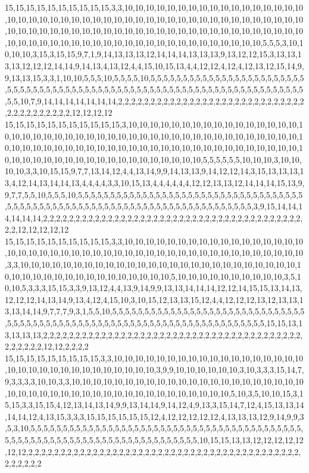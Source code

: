 15,15,15,15,15,15,15,15,15,15,3,3,10,10,10,10,10,10,10,10,10,10,10,10,10,10,10,10,10,10,10,10,10,10,10,10,10,10,10,10,10,10,10,10,10,10,10,10,10,10,10,10,10,10,10,10,10,10,10,10,10,10,10,10,10,10,10,10,10,10,10,10,10,10,10,10,10,10,10,10,10,10,10,10,10,10,10,10,10,10,10,10,10,10,10,10,10,10,10,10,10,10,10,10,10,10,10,10,10,5,5,5,3,10,10,10,10,3,15,3,15,15,9,7,1,9,14,13,13,13,12,14,14,14,13,13,13,9,13,12,12,15,3,13,13,13,13,12,12,12,14,14,9,14,13,4,13,12,4,4,15,10,15,13,4,4,12,12,4,12,4,12,13,12,15,14,9,9,13,13,15,3,3,1,10,10,5,5,5,10,5,5,5,5,10,5,5,5,5,5,5,5,5,5,5,5,5,5,5,5,5,5,5,5,5,5,5,5,5,5,5,5,5,5,5,5,5,5,5,5,5,5,5,5,5,5,5,5,5,5,5,5,5,5,5,5,5,5,5,5,5,5,5,5,5,5,5,5,5,5,5,5,5,5,5,5,5,10,7,9,14,14,14,14,14,14,14,2,2,2,2,2,2,2,2,2,2,2,2,2,2,2,2,2,2,2,2,2,2,2,2,2,2,2,2,2,2,2,2,2,2,2,2,2,2,2,12,12,12,12
15,15,15,15,15,15,15,15,15,15,15,3,10,10,10,10,10,10,10,10,10,10,10,10,10,10,10,10,10,10,10,10,10,10,10,10,10,10,10,10,10,10,10,10,10,10,10,10,10,10,10,10,10,10,10,10,10,10,10,10,10,10,10,10,10,10,10,10,10,10,10,10,10,10,10,10,10,10,10,10,10,10,10,10,10,10,10,10,10,10,10,10,10,10,10,10,10,10,10,10,10,10,10,5,5,5,5,5,5,10,10,10,3,10,10,10,10,3,3,10,15,15,9,7,7,13,14,12,4,4,13,14,9,9,14,13,13,9,14,12,12,14,3,15,13,13,13,13,4,12,14,13,14,14,13,4,4,4,4,3,3,10,15,13,4,4,4,4,4,4,12,12,13,13,12,14,14,14,15,13,9,9,7,7,5,5,10,5,5,5,10,5,5,5,5,5,5,5,5,5,5,5,5,5,5,5,5,5,5,5,5,5,5,5,5,5,5,5,5,5,5,5,5,5,5,5,5,5,5,5,5,5,5,5,5,5,5,5,5,5,5,5,5,5,5,5,5,5,5,5,5,5,5,5,5,5,5,5,5,5,5,5,5,5,3,9,15,14,14,14,14,14,14,2,2,2,2,2,2,2,2,2,2,2,2,2,2,2,2,2,2,2,2,2,2,2,2,2,2,2,2,2,2,2,2,2,2,2,2,2,2,2,2,2,2,12,12,12,12,12
15,15,15,15,15,15,15,15,15,15,3,3,10,10,10,10,10,10,10,10,10,10,10,10,10,10,10,10,10,10,10,10,10,10,10,10,10,10,10,10,10,10,10,10,10,10,10,10,10,10,10,10,10,10,10,10,10,3,3,10,10,10,10,10,10,10,10,10,10,10,10,10,10,10,10,10,10,10,10,10,10,10,10,10,10,10,10,10,10,10,10,10,10,10,10,10,10,10,10,10,10,5,10,10,10,10,10,10,10,10,10,10,3,5,10,10,5,3,3,3,15,15,3,3,9,13,12,4,4,13,9,14,9,9,13,13,14,14,14,12,12,14,15,15,13,14,13,12,12,12,14,13,14,9,13,4,12,4,15,10,3,10,15,12,13,13,15,12,4,4,12,12,12,13,12,13,13,13,13,14,14,9,7,7,7,9,3,1,5,5,10,5,5,5,5,5,5,5,5,5,5,5,5,5,5,5,5,5,5,5,5,5,5,5,5,5,5,5,5,5,5,5,5,5,5,5,5,5,5,5,5,5,5,5,5,5,5,5,5,5,5,5,5,5,5,5,5,5,5,5,5,5,5,5,5,5,5,5,5,5,5,15,15,13,13,13,13,13,2,2,2,2,2,2,2,2,2,2,2,2,2,2,2,2,2,2,2,2,2,2,2,2,2,2,2,2,2,2,2,2,2,2,2,2,2,2,2,2,2,2,2,2,2,2,12,12,2,2,2,2
15,15,15,15,15,15,15,15,15,3,3,10,10,10,10,10,10,10,10,10,10,10,10,10,10,10,10,10,10,10,10,10,10,10,10,10,10,10,10,10,10,10,10,3,9,9,10,10,10,10,10,10,3,10,3,3,3,15,14,7,9,3,3,3,3,10,10,3,3,10,10,10,10,10,10,10,10,10,10,10,10,10,10,10,10,10,10,10,10,10,10,10,10,10,10,10,10,10,10,10,10,10,10,10,10,10,10,10,10,10,10,10,5,10,3,5,10,10,15,3,15,15,3,3,15,15,4,12,13,14,13,14,9,9,13,14,14,9,14,12,4,9,13,3,15,14,7,12,4,15,13,13,14,14,14,12,4,13,15,3,3,3,15,15,15,15,15,15,12,4,12,12,12,12,12,4,13,13,13,12,9,14,9,9,3,5,3,10,5,5,5,5,5,5,5,5,5,5,5,5,5,5,5,5,5,5,5,5,5,5,5,5,5,5,5,5,5,5,5,5,5,5,5,5,5,5,5,5,5,5,5,5,5,5,5,5,5,5,5,5,5,5,5,5,5,5,5,5,5,5,5,5,5,5,5,5,5,5,5,5,10,15,15,13,13,12,12,12,12,12,12,12,2,2,2,2,2,2,2,2,2,2,2,2,2,2,2,2,2,2,2,2,2,2,2,2,2,2,2,2,2,2,2,2,2,2,2,2,2,2,2,2,2,2,2,2,2,2,2,2
